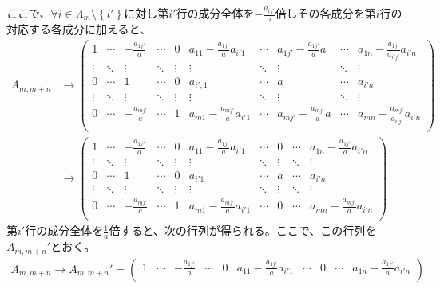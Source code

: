 \documentclass[dvipdfmx]{jsarticle}
\begin{document}
\begin{dfn}
\begin{comment}
\end{align*}
\end{comment}
ここで、$\forall i \in \varLambda_{m} \setminus \left\{ i' \right\}$に対し第$i'$行の成分全体を$- \frac{a_{ij'}}{a}$倍しその各成分を第$i$行の対応する各成分に加えると、
\begin{align*}
A_{m,m + n} &\rightarrow \begin{pmatrix}
1 & \cdots & - \frac{a_{1j'}}{a} & \cdots & 0 & a_{11} - \frac{a_{1j'}}{a}a_{i'1} & \cdots & a_{1j'} - \frac{a_{1j'}}{a}a & \cdots & a_{1n} - \frac{a_{1j'}}{a_{i'j'}}a_{i'n} \\
 \vdots & \ddots & \vdots & \ddots & \vdots & \vdots & \ddots & \vdots & \ddots & \vdots \\
0 & \cdots & 1 & \cdots & 0 & a_{i',1} & \cdots & a & \cdots & a_{i'n} \\
 \vdots & \ddots & \vdots & \ddots & \vdots & \vdots & \ddots & \vdots & \ddots & \vdots \\
0 & \cdots & - \frac{a_{mj'}}{a} & \cdots & 1 & a_{m1} - \frac{a_{mj'}}{a}a_{i'1} & \cdots & a_{mj'} - \frac{a_{mj'}}{a}a & \cdots & a_{mn} - \frac{a_{mj'}}{a_{i'j'}}a_{i'n} \\
\end{pmatrix}\\
&\rightarrow \begin{pmatrix}
1 & \cdots & - \frac{a_{1j'}}{a} & \cdots & 0 & a_{11} - \frac{a_{1j'}}{a}a_{i'1} & \cdots & 0 & \cdots & a_{1n} - \frac{a_{1j'}}{a}a_{i'n} \\
 \vdots & \ddots & \vdots & \ddots & \vdots & \vdots & \ddots & \vdots & \ddots & \vdots \\
0 & \cdots & 1 & \cdots & 0 & a_{i'1} & \cdots & a & \cdots & a_{i'n} \\
 \vdots & \ddots & \vdots & \ddots & \vdots & \vdots & \ddots & \vdots & \ddots & \vdots \\
0 & \cdots & - \frac{a_{mj'}}{a} & \cdots & 1 & a_{m1} - \frac{a_{mj'}}{a}a_{i'1} & \cdots & 0 & \cdots & a_{mn} - \frac{a_{mj'}}{a}a_{i'n} \\
\end{pmatrix}
\end{align*}
第$i'$行の成分全体を$\frac{1}{a}$倍すると、次の行列が得られる。ここで、この行列を$A_{m,m + n}'$とおく。
\begin{align*}
A_{m,m + n} \rightarrow A_{m,m + n}' = \begin{pmatrix}
1 & \cdots & - \frac{a_{1j'}}{a} & \cdots & 0 & a_{11} - \frac{a_{1j'}}{a}a_{i'1} & \cdots & 0 & \cdots & a_{1n} - \frac{a_{1j'}}{a}a_{i'n} \\

\end{pmatrix}
\end{align*}
\end{dfn}
\end{document}
